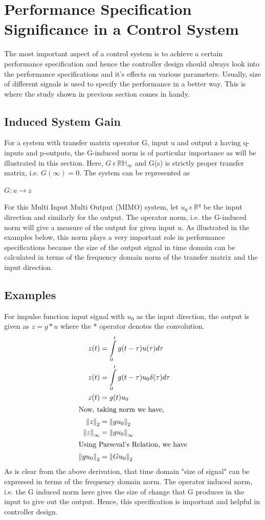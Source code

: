 \documentclass[a4paper,12pt]{article}
\newcommand\norm[1]{\left\lVert#1\right\rVert}
\begin{document}
\section{Performance Specification Significance in a Control System} The most important aspect of a control system is to achieve a certain performance specification and hence the controller design should always look into the performance specifications and it's effects on various parameters. Usually, size of different signals is used to specify the performance in a better way. This is where the study shown in previous section comes in handy.
	\subsection{Induced System Gain} For a system with transfer matrix operator G, input u and output z having q-inputs and p-outputs, the G-induced norm is of particular importance as will be illustrated in this section. Here, $ G \:\epsilon\: \mathbb{R}\mathbb{H}_{\infty} $ and G(s) is strictly proper transfer matrix, i.e. $G(\infty) = 0 $.
	The system can be represented as \\
	\begin{center}
		$G : u \rightarrow z$
	\end{center}
	For this Multi Input Multi Output (MIMO) system, let $u_{0} \: \epsilon \: \mathbb{R}^{q} $ be the input direction and similarly for the output. The operator norm, i.e. the G-induced norm will give a measure of the output for given input u. As illustrated in the examples below, this norm plays a very important role in performance specifications because the size of the output signal in time domain can be calculated in terms of the frequency domain norm of the transfer matrix and the input direction. 
	\subsection{Examples}
	For impulse function input signal with $u_{0}$ as the input direction, the output is given as $z=g*u$ where the * operator denotes the convolution. 
	\begin{align*}
		z(t) &= \int\limits_{0}^t g(t-\tau)u(\tau)d\tau\\
		z(t) &= \int\limits_{0}^t g(t-\tau)u_{0}\delta(\tau)d\tau\\
		z(t) &= g(t)u_{0}\\
		\intertext{Now, taking norm we have,}
		\norm{z}_{2} &= \norm{gu_{0}}_{2}\\
		\norm{z}_{\infty} &= \norm{gu_{0}}_{\infty}\\
		\intertext{Using Parseval's Relation, we have}
		\norm{gu_{0}}_{2} &= \norm{Gu_{0}}_{2}\\
	\end{align*}
	As is clear from the above derivation, that time domain "size of signal" can be expressed in terms of the frequency domain norm. The operator induced norm, i.e. the G induced norm here gives the size of change that G produces in the input to give out the output. Hence, this specification is important and helpful in controller design.
\end{document}
